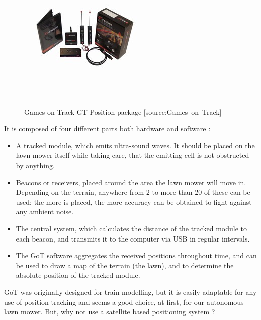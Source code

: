 \begin{figure}[H]
\centering
\includegraphics[scale=1.1]{figures/gotSystem.jpg} 
\label{fig:gotsystem}
\caption{Games on Track GT-Position package [source:Games\ on\ Track]} 
\end{figure}
\noindent

\noindent
It is composed of four different parts both hardware and software :
\begin{itemize}
	\item A tracked module, which emits ultra-sound waves. It should be placed on the lawn mower itself while taking care, that the emitting cell is not obstructed by anything.
	\item Beacons or receivers, placed around the area the lawn mower will move in. Depending on the terrain, anywhere from 2  to more than 20 of these can be used: the more is placed, the more accuracy can be obtained to fight against any ambient noise.
	\item The central system, which calculates the distance of the tracked module to each beacon, and transmits it to the computer via USB in regular intervals.
	\item The GoT software aggregates the received positions throughout time, and can be used to draw a map of the terrain (the lawn), and to determine the absolute position of the tracked module.
\end{itemize}

GoT was originally designed for train modelling, but it is easily adaptable for any use of position tracking and seems a good choice, at first, for our autonomous lawn mower.
But, why not use a satellite based positioning system ?

